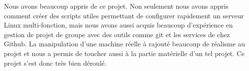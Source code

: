 Nous avons beaucoup appris de ce projet. Non seulement nous avons appris comment créer des scripts utiles permettant de configurer rapidement un serveur Linux multi-fonction, mais nous avons aussi acquis beaucoup d'expérience en gestion de projet de groupe avec des outils comme git et les services de chez Github. La manipulation d'une machine réelle à rajouté beaucoup de réalisme au projet et nous a permis de toucher aussi à la partie matérielle d'un tel projet. Ce projet s'est donc très bien déroulé.
